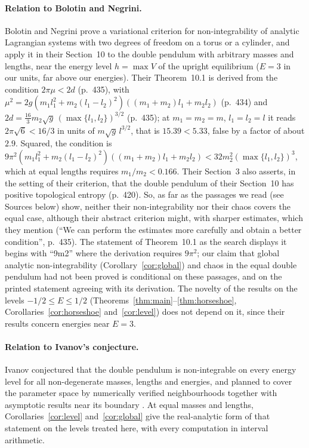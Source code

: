 \documentclass[11pt]{article}
\theoremstyle{definition}
\begin{document}
\paragraph{Relation to Bolotin and Negrini.} Bolotin and Negrini \cite{bn1997} prove a variational criterion for non-integrability of analytic Lagrangian systems with two degrees of freedom on a torus or a cylinder, and apply it in their Section~10 to the double pendulum with arbitrary masses and lengths, near the energy level $h = \max V$ of the upright equilibrium ($E = 3$ in our units, far above our energies). Their Theorem~10.1 is derived from the condition $2\pi\mu < 2d$ (p.~435), with $\mu^2 = 2g(m_1l_1^2 + m_2(l_1 - l_2)^2)((m_1 + m_2)l_1 + m_2l_2)$ (p.~434) and $2d = \frac{16}{3}m_2\sqrt g\,(\max\{l_1, l_2\})^{3/2}$ (p.~435); at $m_1 = m_2 = m$, $l_1 = l_2 = l$ it reads $2\pi\sqrt6 < 16/3$ in units of $m\sqrt g\,l^{3/2}$, that is $15.39 < 5.33$, false by a factor of about $2.9$. Squared, the condition is $9\pi^2(m_1l_1^2 + m_2(l_1 - l_2)^2)((m_1 + m_2)l_1 + m_2l_2) < 32m_2^2(\max\{l_1, l_2\})^3$, which at equal lengths requires $m_1/m_2 < 0.166$. Their Section~3 also asserts, in the setting of their criterion, that the double pendulum of their Section~10 has positive topological entropy (p.~420). So, as far as the passages we read (see Sources below) show, neither their non-integrability nor their chaos covers the equal case, although their abstract criterion might, with sharper estimates, which they mention (``We can perform the estimates more carefully and obtain a better condition'', p.~435). The statement of Theorem~10.1 as the search displays it begins with ``9m2'' where the derivation requires $9\pi^2$; our claim that global analytic non-integrability (Corollary~\ref{cor:global}) and chaos in the equal double pendulum had not been proved is conditional on these passages, and on the printed statement agreeing with its derivation. The novelty of the results on the levels $-1/2 \le E \le 1/2$ (Theorems~\ref{thm:main}--\ref{thm:horseshoe}, Corollaries~\ref{cor:horseshoe} and~\ref{cor:level}) does not depend on it, since their results concern energies near $E = 3$.

\paragraph{Relation to Ivanov's conjecture.} Ivanov \cite[p.~105]{ivanov1} conjectured that the double pendulum is non-integrable on every energy level for all non-degenerate masses, lengths and energies, and planned to cover the parameter space by numerically verified neighbourhoods together with asymptotic results near its boundary \cite{ivanov1, ivanov3, ivanov4}. At equal masses and lengths, Corollaries~\ref{cor:level} and~\ref{cor:global} give the real-analytic form of that statement on the levels treated here, with every computation in interval arithmetic.
\end{document}
